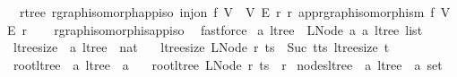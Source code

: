 \begin{isabellebody}
\isanewline
{}\isamarkupfalse%
\ {\isacharparenleft}{\kern0pt}\ rtree{\isacharparenright}{\kern0pt}\ rgraph{\isacharunderscore}{\kern0pt}isomorph{\isacharunderscore}{\kern0pt}app{\isacharunderscore}{\kern0pt}iso{\isacharcolon}{\kern0pt}\ {\isachardoublequoteopen}inj{\isacharunderscore}{\kern0pt}on\ f\ V\ {\isasymLongrightarrow}\ {\isacharparenleft}{\kern0pt}V{\isacharcomma}{\kern0pt}\ E{\isacharcomma}{\kern0pt}\ r{\isacharparenright}{\kern0pt}\ {\isasymsimeq}\isactrlsub r\ app{\isacharunderscore}{\kern0pt}rgraph{\isacharunderscore}{\kern0pt}isomorphism\ f\ {\isacharparenleft}{\kern0pt}V{\isacharcomma}{\kern0pt}\ E{\isacharcomma}{\kern0pt}\ r{\isacharparenright}{\kern0pt}{\isachardoublequoteclose}\isanewline
%
\isadelimproof
\ \ %
\endisadelimproof
%
\isatagproof
{}\isamarkupfalse%
\ rgraph{\isacharunderscore}{\kern0pt}isomorphis{\isacharunderscore}{\kern0pt}app{\isacharunderscore}{\kern0pt}iso\ \isamarkupfalse%
\ fastforce%
\endisatagproof
{\isafoldproof}%
%
\isadelimproof
\isanewline
%
\endisadelimproof
\isanewline
\isanewline
{}\isamarkupfalse%
\ {\isacharprime}{\kern0pt}a\ ltree\ {\isacharequal}{\kern0pt}\ LNode\ {\isacharprime}{\kern0pt}a\ {\isachardoublequoteopen}{\isacharprime}{\kern0pt}a\ ltree\ list{\isachardoublequoteclose}\isanewline
\isanewline
{}\isamarkupfalse%
\ ltree{\isacharunderscore}{\kern0pt}size\ {\isacharcolon}{\kern0pt}{\isacharcolon}{\kern0pt}\ {\isachardoublequoteopen}{\isacharprime}{\kern0pt}a\ ltree\ {\isasymRightarrow}\ nat{\isachardoublequoteclose}\ \isanewline
\ \ {\isachardoublequoteopen}ltree{\isacharunderscore}{\kern0pt}size\ {\isacharparenleft}{\kern0pt}LNode\ r\ ts{\isacharparenright}{\kern0pt}\ {\isacharequal}{\kern0pt}\ Suc\ {\isacharparenleft}{\kern0pt}{\isasymSum}t{\isasymleftarrow}ts{\isachardot}{\kern0pt}\ ltree{\isacharunderscore}{\kern0pt}size\ t{\isacharparenright}{\kern0pt}{\isachardoublequoteclose}\isanewline
\isanewline
{}\isamarkupfalse%
\ root{\isacharunderscore}{\kern0pt}ltree\ {\isacharcolon}{\kern0pt}{\isacharcolon}{\kern0pt}\ {\isachardoublequoteopen}{\isacharprime}{\kern0pt}a\ ltree\ {\isasymRightarrow}\ {\isacharprime}{\kern0pt}a{\isachardoublequoteclose}\ \isanewline
\ \ {\isachardoublequoteopen}root{\isacharunderscore}{\kern0pt}ltree\ {\isacharparenleft}{\kern0pt}LNode\ r\ ts{\isacharparenright}{\kern0pt}\ {\isacharequal}{\kern0pt}\ r{\isachardoublequoteclose}\isanewline
\isanewline
{}\isamarkupfalse%
\ nodes{\isacharunderscore}{\kern0pt}ltree\ {\isacharcolon}{\kern0pt}{\isacharcolon}{\kern0pt}\ {\isachardoublequoteopen}{\isacharprime}{\kern0pt}a\ ltree\ {\isasymRightarrow}\ {\isacharprime}{\kern0pt}a\ set{\isachardoublequoteclose}\ \isanewline

\end{isabellebody}
